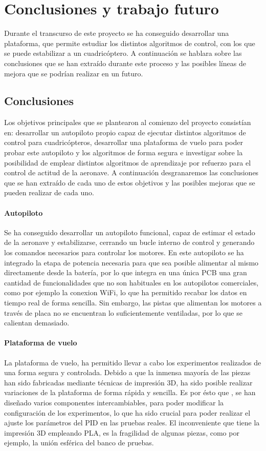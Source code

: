 \chapter{Conclusiones y trabajo futuro}

Durante el transcurso de este proyecto se ha conseguido desarrollar una plataforma, que permite estudiar los distintos algoritmos de control, con los que se puede estabilizar a un cuadricóptero. A continuación se hablara sobre las conclusiones que se han extraído durante este proceso y las posibles líneas de mejora que se podrían realizar en un futuro.

\section{Conclusiones}

Los objetivos principales que se plantearon al comienzo del proyecto consistían en: desarrollar un autopiloto propio capaz de ejecutar distintos algoritmos de control para cuadricópteros, desarrollar una plataforma de vuelo para poder probar este autopiloto y los algoritmos de forma segura e investigar sobre la posibilidad de emplear distintos algoritmos de aprendizaje por refuerzo para el control de actitud de la aeronave. A continuación desgranaremos las conclusiones que se han extraído de cada uno de estos objetivos y las posibles mejoras que se pueden realizar de cada uno.

\subsubsection{Autopiloto}
Se ha conseguido desarrollar un autopiloto funcional, capaz de estimar el estado de la aeronave y estabilizarse, cerrando un bucle interno de control y generando los comandos necesarios para controlar los motores. En este autopiloto se ha integrado la etapa de potencia necesaria para que sea posible alimentar al mismo directamente desde la batería, por lo que integra en una única PCB una gran cantidad de funcionalidades que no son habituales en los autopilotos comerciales, como por ejemplo la conexion WiFi, lo que ha permitido recabar los datos en tiempo real de forma sencilla. Sin embargo, las pistas que alimentan los motores a través de placa no se encuentran lo suficientemente ventiladas, por lo que se calientan demasiado.

\subsubsection{Plataforma de vuelo}
La plataforma de vuelo, ha permitido llevar a cabo los experimentos realizados de una forma segura y controlada. Debido a que la inmensa mayoría de las piezas han sido fabricadas mediante técnicas de impresión 3D, ha sido posible realizar variaciones de la plataforma de forma rápida y sencilla. Es por ésto que ,  se han diseñado varios componentes intercambiables, para poder modificar la configuración de los experimentos, lo que ha sido crucial para poder realizar el ajuste los parámetros del PID en las pruebas reales. El inconveniente que tiene la impresión 3D empleando PLA, es la fragilidad de algunas piezas, como por ejemplo, la unión esférica del banco de pruebas.

